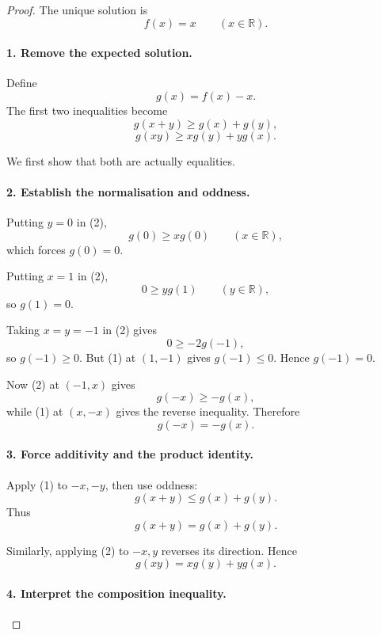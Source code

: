 
\begin{dlsummary}[title={\bfseries Solution 59. The Hidden Product Rule},breakable]

\begin{proof}
The unique solution is
\[
\boxed{f(x)=x\qquad(x\in\mathbb R).}
\]

\paragraph{1. Remove the expected solution.}

Define
\[
g(x)=f(x)-x.
\]
The first two inequalities become
\[
g(x+y)\ge g(x)+g(y), \tag{1}
\]
\[
g(xy)\ge xg(y)+yg(x). \tag{2}
\]

We first show that both are actually equalities.

\paragraph{2. Establish the normalisation and oddness.}

Putting \(y=0\) in (2),
\[
g(0)\ge xg(0)\qquad(x\in\mathbb R),
\]
which forces \(g(0)=0\).

Putting \(x=1\) in (2),
\[
0\ge yg(1)\qquad(y\in\mathbb R),
\]
so \(g(1)=0\).

Taking \(x=y=-1\) in (2) gives
\[
0\ge-2g(-1),
\]
so \(g(-1)\ge0\). But (1) at \((1,-1)\) gives \(g(-1)\le0\). Hence \(g(-1)=0\).

Now (2) at \((-1,x)\) gives
\[
g(-x)\ge-g(x),
\]
while (1) at \((x,-x)\) gives the reverse inequality. Therefore
\[
\boxed{g(-x)=-g(x).} \tag{3}
\]

\paragraph{3. Force additivity and the product identity.}

Apply (1) to \(-x,-y\), then use oddness:
\[
g(x+y)\le g(x)+g(y).
\]
Thus
\[
\boxed{g(x+y)=g(x)+g(y).} \tag{4}
\]

Similarly, applying (2) to \(-x,y\) reverses its direction. Hence
\[
\boxed{g(xy)=xg(y)+yg(x).} \tag{5}
\]

\paragraph{4. Interpret the composition inequality.}


\end{proof}
\end{dlsummary}
